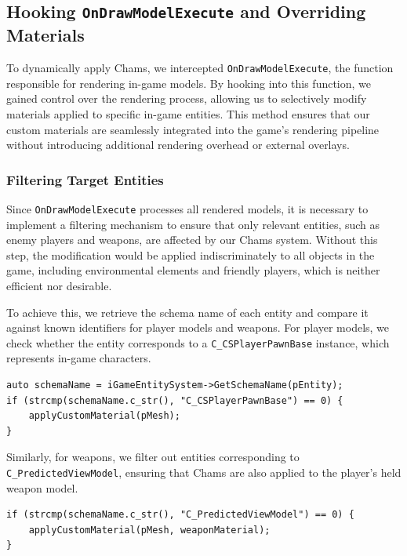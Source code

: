 \subsection{Hooking \texttt{OnDrawModelExecute} and Overriding Materials}

To dynamically apply Chams, we intercepted \texttt{OnDrawModelExecute}, the function responsible for rendering in-game models. By hooking into this function, we gained control over the rendering process, allowing us to selectively modify materials applied to specific in-game entities. This method ensures that our custom materials are seamlessly integrated into the game's rendering pipeline without introducing additional rendering overhead or external overlays.

\subsubsection{Filtering Target Entities}

Since \texttt{OnDrawModelExecute} processes all rendered models, it is necessary to implement a filtering mechanism to ensure that only relevant entities, such as enemy players and weapons, are affected by our Chams system. Without this step, the modification would be applied indiscriminately to all objects in the game, including environmental elements and friendly players, which is neither efficient nor desirable.

To achieve this, we retrieve the schema name of each entity and compare it against known identifiers for player models and weapons. For player models, we check whether the entity corresponds to a \texttt{C\_CSPlayerPawnBase} instance, which represents in-game characters.

\begin{lstlisting}[style=cppstyle, caption={Identifying Player Models}]
auto schemaName = iGameEntitySystem->GetSchemaName(pEntity);
if (strcmp(schemaName.c_str(), "C_CSPlayerPawnBase") == 0) {
    applyCustomMaterial(pMesh);
}
\end{lstlisting}

Similarly, for weapons, we filter out entities corresponding to \texttt{C\_PredictedViewModel}, ensuring that Chams are also applied to the player's held weapon model.

\begin{lstlisting}[style=cppstyle, caption={Applying Chams to Weapons}]
if (strcmp(schemaName.c_str(), "C_PredictedViewModel") == 0) {
    applyCustomMaterial(pMesh, weaponMaterial);
}
\end{lstlisting}

